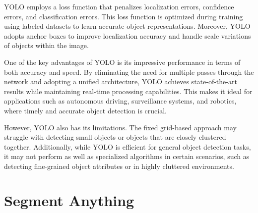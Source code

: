 YOLO employs a loss function that penalizes localization errors, confidence errors, and classification errors. This loss function is optimized during training using labeled datasets to learn accurate object representations. Moreover, YOLO adopts anchor boxes to improve localization accuracy and handle scale variations of objects within the image.

One of the key advantages of YOLO is its impressive performance in terms of both accuracy and speed. By eliminating the need for multiple passes through the network and adopting a unified architecture, YOLO achieves state-of-the-art results while maintaining real-time processing capabilities. This makes it ideal for applications such as autonomous driving, surveillance systems, and robotics, where timely and accurate object detection is crucial.

However, YOLO also has its limitations. The fixed grid-based approach may struggle with detecting small objects or objects that are closely clustered together. Additionally, while YOLO is efficient for general object detection tasks, it may not perform as well as specialized algorithms in certain scenarios, such as detecting fine-grained object attributes or in highly cluttered environments.
\section{Segment Anything}